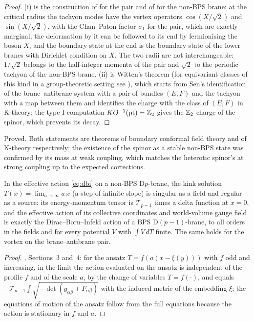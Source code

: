 \begin{proof}
(i) is the construction of \cite[Eqs.~(2.13)--(2.14)]{Sen98spinor} for the pair and of \cite{Sen98cycles} for the non-BPS brane: at the critical radius the tachyon modes have the vertex operators $\cos(X/\sqrt2)$ and $\sin(X/\sqrt2)$, with the Chan--Paton factor $\sigma_1$ for the pair, which are exactly marginal; the deformation by it can be followed to its end by fermionising the boson $X$, and the boundary state at the end is the boundary state of the lower branes with Dirichlet condition on $X$. The two radii are not interchangeable: $1/\sqrt2$ belongs to the half-integer momenta of the pair and $\sqrt2$ to the periodic tachyon of the non-BPS brane. (ii) is Witten's theorem \cite{Witten98K} (for equivariant classes of this kind in a group-theoretic setting see \cite{Bha22a}), which starts from Sen's identification of the brane--antibrane system with a pair of bundles $(E,F)$ and the tachyon with a map between them and identifies the charge with the class of $(E,F)$ in K-theory; the type I computation $KO^{-1}({\rm pt})=\mathbb{Z}_2$ gives the $\mathbb{Z}_2$ charge of the spinor, which prevents its decay.
\end{proof}

\begin{verdict}[claims 19, 20]
Proved. Both statements are theorems of boundary conformal field theory and of K-theory respectively; the existence of the spinor as a stable non-BPS state was confirmed by its mass at weak coupling, which matches the heterotic spinor's at strong coupling up to the expected corrections.
\end{verdict}

\begin{proposition}\label{prop:kinkdbi}
In the effective action \eqref{eq:dbi} on a non-BPS D$p$-brane, the kink solution $T(x) = \lim_{a\to\infty} a\,x$ (a step of infinite slope) is singular as a field and regular as a source: its energy-momentum tensor is $\mathcal T_{p-1}$ times a delta function at $x=0$, and the effective action of its collective coordinates and world-volume gauge field is exactly the Dirac--Born--Infeld action of a BPS D$(p-1)$-brane, to all orders in the fields and for every potential $V$ with $\int V\,dT$ finite. The same holds for the vortex on the brane--antibrane pair.
\end{proposition}

\begin{proof}
\cite{Sen03kink}, Sections~3 and~4: for the ansatz $T = f(a(x-\xi(y)))$ with $f$ odd and increasing, in the limit the action evaluated on the ansatz is independent of the profile $f$ and of the scale $a$, by the change of variables $T = f(\cdot)$, and equals $-\mathcal T_{p-1}\int\sqrt{-\det(g_{\alpha\beta}+F_{\alpha\beta})}$ with the induced metric of the embedding $\xi$; the equations of motion of the ansatz follow from the full equations because the action is stationary in $f$ and $a$.
\end{proof}

